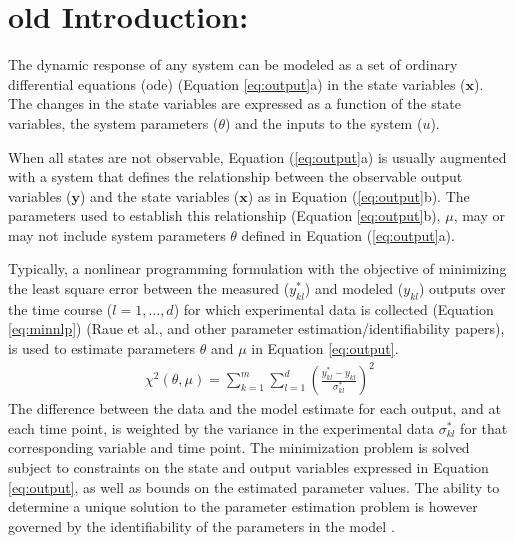 \documentclass[10pt]{article}
\begin{document}
\section{old Introduction:}	
The dynamic response of any system can be modeled as a set of ordinary differential equations (ode) (Equation \ref{eq:output}a) in the state variables ($\mathbf{x}$). The changes in the state variables are expressed as a function of the state variables, the system parameters ($\theta$) and the inputs to the system ($u$).	

When all states are not observable, Equation (\ref{eq:output}a) is usually augmented with a system that defines the relationship between the observable output variables ($\mathbf{y}$) and the state variables ($\mathbf{x}$) as in Equation (\ref{eq:output}b). The parameters used to establish this relationship (Equation \ref{eq:output}b), $\mu$, may or may not include system parameters $\theta$ defined in Equation (\ref{eq:output}a). 

Typically, a nonlinear programming formulation with the objective of minimizing the least square error between the measured ($y_{kl}^*$) and modeled ($y_{kl}$) outputs over the time course ($l = {1, ..., d}$) for which experimental data is collected (Equation \ref{eq:minnlp}) (Raue et al., and other parameter estimation/identifiability papers), is used to estimate parameters $\theta$ and $\mu$ in Equation \ref{eq:output}.
\begin{align}\label{eq:minnlp}
\chi^2(\theta,\mu) = \sum_{k=1}^{m}\sum_{l=1}^{d}\left(\frac{y_{kl}^*-y_{kl}}{\sigma_{kl}^*}\right)^2
\end{align}
The difference between the data and the model estimate for each output, and at each time point, is weighted by the variance in the experimental data $\sigma_{kl}^*$ for that corresponding variable and time point.
The minimization problem is solved subject to constraints on the state and output variables expressed in Equation \ref{eq:output}, as well as bounds on the estimated parameter values. The ability to determine a unique solution to the parameter estimation problem is however governed by the identifiability of the parameters in the model \parencite{McLean2012}. 
\end{document}
